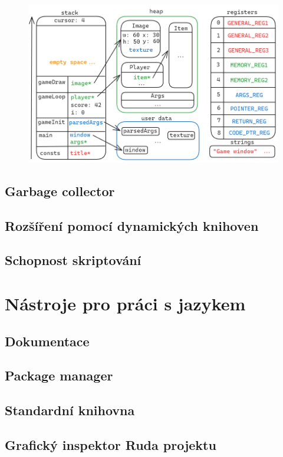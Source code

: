 \documentclass[12pt, a4paper,
twoside,        %
openright
]{report}
\let\oldchapter\chapter
\renewcommand{\chapter}{
	\clearpage
	\pagestyle{fancy}
	\oldchapter
}
\begin{document}
\lipsum[80]

\begin{figure}[h]
	\centering
	\includegraphics[width=0.8\linewidth]{image/memory.png}
\end{figure}

\section{Garbage collector}

\section{Rozšíření pomocí dynamických knihoven}

\section{Schopnost skriptování}

\chapter{Nástroje pro práci s jazykem}

\section{Dokumentace}

\section{Package manager}

\section{Standardní knihovna}

\section{Grafický inspektor Ruda projektu}
\end{document}
